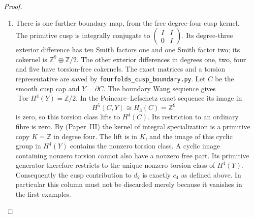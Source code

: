 \documentclass[11pt,a4paper]{article}
\theoremstyle{definition}
\newcommand{\ExternalPaperRef}[3]{\ifmmode\text{\upshape #1#2 (Paper~#3)}\else #1#2 (Paper~#3)\fi}
\begin{document}
\begin{proof}
\begin{enumerate}[label=\arabic*.]
\item There is one further boundary map, from the free
degree-four cusp kernel.
The primitive cusp is integrally conjugate to
$\left(\begin{smallmatrix}I&I\\0&I\end{smallmatrix}\right)$.
Its degree-three exterior difference has ten Smith
factors one and one Smith factor two; its cokernel is
$\mathbb Z^9\oplus\mathbb Z/2$.
The other exterior differences in degrees one, two,
four and five have torsion-free cokernels.
The exact matrices and a torsion representative are
saved by \texttt{fourfolds\_cusp\_boundary.py}.
Let $C$ be the smooth cusp cap and $Y=\partial C$.
The boundary Wang sequence gives
$\operatorname{Tor}H^4(Y)=\mathbb Z/2$.
In the Poincare--Lefschetz exact sequence its image in
\[
 H^5(C,Y)\cong H_3(C)=\mathbb Z^9
\]
is zero, so this torsion class lifts to $H^4(C)$.
Its restriction to an ordinary fibre is zero.
By \ExternalPaperRef{}{6.3}{III} the kernel of integral specialization is
a primitive copy $K=\mathbb Z$ in degree four.
The lift is in $K$, and the image of this cyclic group
in $H^4(Y)$ contains the nonzero torsion class.
A cyclic image containing nonzero torsion cannot
also have a nonzero free part.
Its primitive generator therefore restricts to the
unique nonzero torsion class of $H^4(Y)$.
Consequently the cusp contribution to $d_2$ is
exactly $c_4$ as defined above.  In particular this
column must not be discarded merely because it
vanishes in the first examples.


\end{enumerate}
\end{proof}
\end{document}
